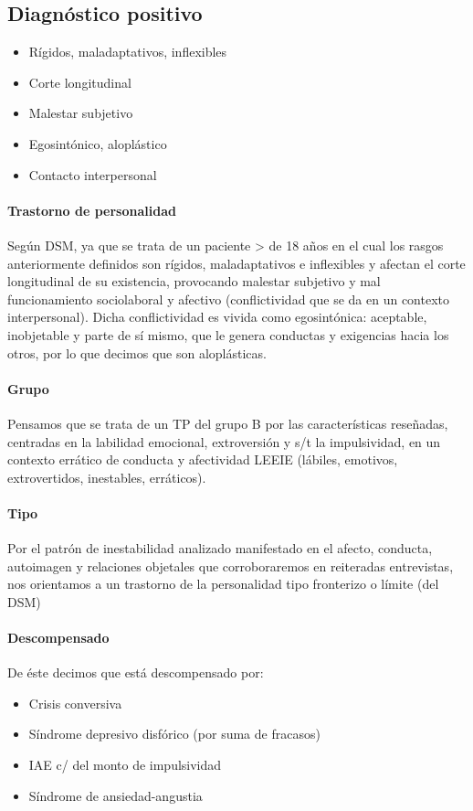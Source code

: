 \documentclass{scrbook}
\begin{document}
\subsection*{Diagnóstico positivo}
\begin{itemize}
    \item Rígidos, maladaptativos, inflexibles
    \item Corte longitudinal
    \item Malestar subjetivo
    \item Egosintónico, aloplástico
    \item Contacto interpersonal
\end{itemize}
\paragraph{Trastorno de personalidad}
Según DSM, ya que se trata de un paciente > de 18 años en el cual los rasgos anteriormente definidos son rígidos, maladaptativos e inflexibles y afectan el corte longitudinal de su existencia, provocando malestar subjetivo y mal funcionamiento sociolaboral y afectivo (conflictividad que se da en un contexto interpersonal). Dicha conflictividad es vivida como egosintónica: aceptable, inobjetable y parte de sí mismo, que le genera conductas y exigencias hacia los otros, por lo que decimos que son aloplásticas.
\paragraph{Grupo}
Pensamos que se trata de un TP del grupo B por las características reseñadas, centradas en la labilidad emocional, extroversión y s/t la impulsividad, en un contexto errático de conducta y afectividad LEEIE (lábiles, emotivos, extrovertidos, inestables, erráticos).
\paragraph{Tipo}
Por el patrón de inestabilidad analizado manifestado en el afecto, conducta, autoimagen y relaciones objetales que corroboraremos en reiteradas entrevistas, nos orientamos a un trastorno de la personalidad tipo fronterizo o límite (del DSM)
\paragraph{Descompensado}
De éste decimos que está descompensado por:
\begin{itemize}
    \item Crisis conversiva
    \item Síndrome depresivo disfórico (por suma de fracasos)
    \item IAE c/ del monto de impulsividad
    \item Síndrome de ansiedad-angustia
\end{itemize}
\end{document}
